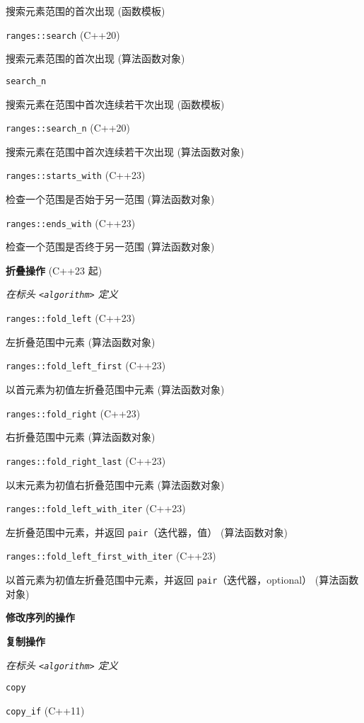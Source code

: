 搜索元素范围的⾸次出现 (函数模板)

\noindent \lstinline{ranges::search} (C++20)

搜索元素范围的⾸次出现 (算法函数对象)

\noindent \lstinline{search_n}

搜索元素在范围中⾸次连续若⼲次出现 (函数模板)

\noindent \lstinline{ranges::search_n} (C++20) 

搜索元素在范围中⾸次连续若⼲次出现 (算法函数对象)

\noindent \lstinline{ranges::starts_with} (C++23)

检查⼀个范围是否始于另⼀范围 (算法函数对象)

\noindent \lstinline{ranges::ends_with} (C++23)

检查⼀个范围是否终于另⼀范围 (算法函数对象)

\noindent \textbf{折叠操作} (C++23 起)

\textit{在标头 \lstinline{<algorithm>} 定义}

\noindent \lstinline{ranges::fold_left} (C++23)

左折叠范围中元素 (算法函数对象)

\noindent \lstinline{ranges::fold_left_first} (C++23)

以⾸元素为初值左折叠范围中元素 (算法函数对象)

\noindent \lstinline{ranges::fold_right} (C++23)

右折叠范围中元素 (算法函数对象)

\noindent \lstinline{ranges::fold_right_last} (C++23)

以末元素为初值右折叠范围中元素 (算法函数对象)

\noindent \lstinline{ranges::fold_left_with_iter} (C++23) 

左折叠范围中元素，并返回 \lstinline{pair}（迭代器，值） (算法函数对象)

\noindent \lstinline{ranges::fold_left_first_with_iter} (C++23) 

以⾸元素为初值左折叠范围中元素，并返回 \lstinline{pair}（迭代器，optional） (算法函数对象)

\textbf{修改序列的操作}

\noindent \textbf{复制操作} 

\textit{在标头 \lstinline{<algorithm>} 定义}

\noindent \lstinline{copy}

\noindent \lstinline{copy_if} (C++11)

